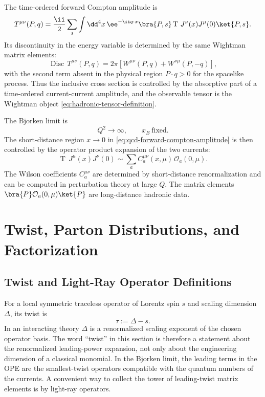 The time-ordered forward Compton amplitude is
\begin{equation}
  T^{\mu\nu}(P,q)
  =
  \frac{\ii}{2}\sum_s
  \int\dd^4x\,\ee^{-\ii q\cdot x}
  \bra{P,s}\operatorname T\,J^\nu(x)J^\mu(0)\ket{P,s}.
  \label{eq:qcd-forward-compton-amplitude}
\end{equation}
Its discontinuity in the energy variable is determined by the same Wightman
matrix elements:
\begin{equation}
  \operatorname{Disc}\,T^{\mu\nu}(P,q)
  =
  2\pi
  \left[
    W^{\mu\nu}(P,q)
    +W^{\nu\mu}(P,-q)
  \right],
  \label{eq:qcd-dis-discontinuity}
\end{equation}
with the second term absent in the physical region \(P\cdot q>0\) for the
spacelike process.  Thus the inclusive cross section is controlled by the
absorptive part of a time-ordered current-current amplitude, and the
observable tensor is the Wightman object
\eqref{eq:hadronic-tensor-definition}.

The Bjorken limit is
\[
  Q^2\to\infty,
  \qquad
  x_B\ \text{fixed}.
\]
The short-distance region \(x\to0\) in
\eqref{eq:qcd-forward-compton-amplitude} is then controlled by the operator
product expansion of the two currents:
\begin{equation}
  \operatorname T\,J^\mu(x)J^\nu(0)
  \sim
  \sum_a C_a^{\mu\nu}(x,\mu)\,\mathcal O_a(0,\mu).
  \label{eq:dis-current-ope}
\end{equation}
The Wilson coefficients \(C_a^{\mu\nu}\) are determined by short-distance
renormalization and can be computed in perturbation theory at large \(Q\).  The
matrix elements
\(\bra{P}\mathcal O_a(0,\mu)\ket{P}\) are long-distance hadronic data.

\section{Twist, Parton Distributions, and Factorization}
\label{sec:qcd-twist-parton-distributions-factorization}

\subsection{Twist and Light-Ray Operator Definitions}
\label{subsec:qcd-twist-light-ray-operator-definitions}

For a local symmetric traceless operator of Lorentz spin \(s\) and scaling
dimension \(\Delta\), its twist is
\[
  \tau:=\Delta-s .
\]
In an interacting theory \(\Delta\) is a renormalized scaling exponent of the
chosen operator basis.  The word ``twist'' in this section is therefore a
statement about the renormalized leading-power expansion, not only about the
engineering dimension of a classical monomial.  In the Bjorken limit, the
leading terms in the OPE are the smallest-twist operators compatible with the
quantum numbers of the currents.  A convenient way to collect the tower of
leading-twist matrix elements is by light-ray operators.

